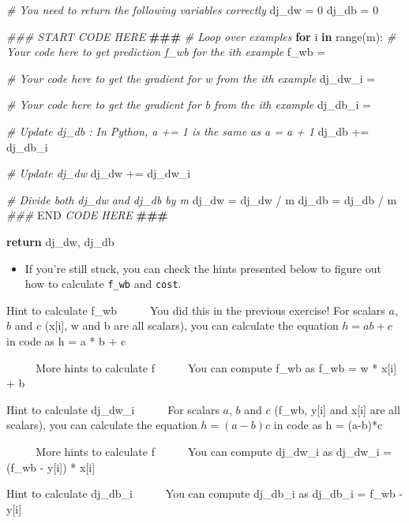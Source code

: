\documentclass[11pt]{article}
\providecommand{\tightlist}{%
      \setlength{\itemsep}{0pt}\setlength{\parskip}{0pt}}
\newenvironment{Shaded}{}{}
\newcommand{\KeywordTok}[1]{\textcolor[rgb]{0.00,0.44,0.13}{\textbf{{#1}}}}
\newcommand{\DecValTok}[1]{\textcolor[rgb]{0.25,0.63,0.44}{{#1}}}
\newcommand{\CommentTok}[1]{\textcolor[rgb]{0.38,0.63,0.69}{\textit{{#1}}}}
\newcommand{\AlertTok}[1]{\textcolor[rgb]{1.00,0.00,0.00}{\textbf{{#1}}}}
\newcommand{\RegionMarkerTok}[1]{{#1}}
\newcommand{\NormalTok}[1]{{#1}}
\newcommand{\ControlFlowTok}[1]{\textcolor[rgb]{0.00,0.44,0.13}{\textbf{{#1}}}}
\newcommand{\OperatorTok}[1]{\textcolor[rgb]{0.40,0.40,0.40}{{#1}}}
\newcommand{\BuiltInTok}[1]{{#1}}
\begin{document}
\begin{itemize}
\begin{Shaded}
\begin{Highlighting}[]
    \CommentTok{\# You need to return the following variables correctly}
\NormalTok{    dj\_dw }\OperatorTok{=} \DecValTok{0}
\NormalTok{    dj\_db }\OperatorTok{=} \DecValTok{0}

    \CommentTok{\#\#\# START CODE HERE }\AlertTok{\#\#\#}\CommentTok{ }
    \CommentTok{\# Loop over examples}
    \ControlFlowTok{for}\NormalTok{ i }\KeywordTok{in} \BuiltInTok{range}\NormalTok{(m):  }
        \CommentTok{\# Your code here to get prediction f\_wb for the ith example}
\NormalTok{        f\_wb }\OperatorTok{=} 

        \CommentTok{\# Your code here to get the gradient for w from the ith example }
\NormalTok{        dj\_dw\_i }\OperatorTok{=} 

        \CommentTok{\# Your code here to get the gradient for b from the ith example }
\NormalTok{        dj\_db\_i }\OperatorTok{=} 

        \CommentTok{\# Update dj\_db : In Python, a += 1  is the same as a = a + 1}
\NormalTok{        dj\_db }\OperatorTok{+=}\NormalTok{ dj\_db\_i}

        \CommentTok{\# Update dj\_dw}
\NormalTok{        dj\_dw }\OperatorTok{+=}\NormalTok{ dj\_dw\_i}

    \CommentTok{\# Divide both dj\_dw and dj\_db by m}
\NormalTok{    dj\_dw }\OperatorTok{=}\NormalTok{ dj\_dw }\OperatorTok{/}\NormalTok{ m}
\NormalTok{    dj\_db }\OperatorTok{=}\NormalTok{ dj\_db }\OperatorTok{/}\NormalTok{ m}
    \CommentTok{\#\#\# }\RegionMarkerTok{END}\CommentTok{ CODE HERE }\AlertTok{\#\#\#}\CommentTok{ }

    \ControlFlowTok{return}\NormalTok{ dj\_dw, dj\_db}
\end{Highlighting}
\end{Shaded}

  \begin{itemize}
  \tightlist
  \item
    If you're still stuck, you can check the hints presented below to
    figure out how to calculate \texttt{f\_wb} and \texttt{cost}.
  \end{itemize}

  Hint to calculate f\_wb     You did this in the previous exercise! For
  scalars \(a\), \(b\) and \(c\) (x{[}i{]}, w and b are all scalars),
  you can calculate the equation \(h = ab + c\) in code as h = a * b + c

      More hints to calculate f     You can compute f\_wb as f\_wb = w *
  x{[}i{]} + b

  Hint to calculate dj\_dw\_i     For scalars \(a\), \(b\) and \(c\)
  (f\_wb, y{[}i{]} and x{[}i{]} are all scalars), you can calculate the
  equation \(h = (a - b)c\) in code as h = (a-b)*c

      More hints to calculate f     You can compute dj\_dw\_i as
  dj\_dw\_i = (f\_wb - y{[}i{]}) * x{[}i{]}

  Hint to calculate dj\_db\_i     You can compute dj\_db\_i as dj\_db\_i
  = f\_wb - y{[}i{]}
\end{itemize}
\end{document}
